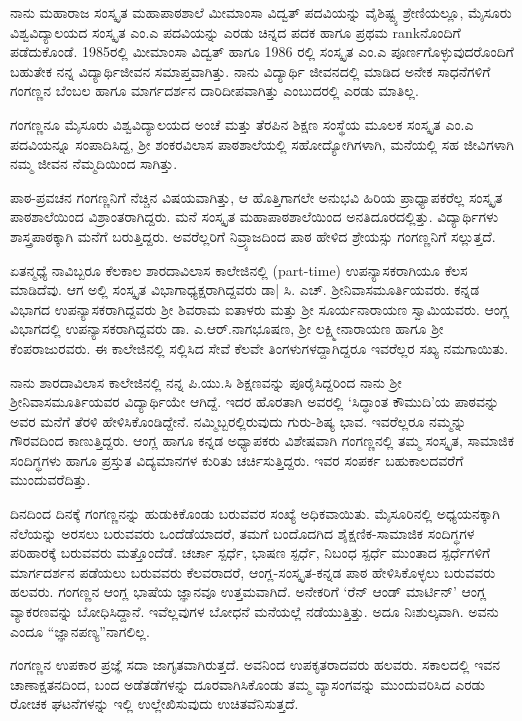 ನಾನು ಮಹಾರಾಜ ಸಂಸ್ಕೃತ ಮಹಾಪಾಠಶಾಲೆ ಮೀಮಾಂಸಾ ವಿದ್ವತ್ ಪದವಿಯನ್ನು ವೈಶಿಷ್ಟ್ಯ ಶ್ರೇಣಿಯಲ್ಲೂ, ಮೈಸೂರು  ವಿಶ್ವವಿದ್ಯಾಲಯದ ಸಂಸ್ಕೃತ  ಎಂ.ಎ ಪದವಿಯನ್ನು ಎರಡು ಚಿನ್ನದ ಪದಕ ಹಾಗೂ ಪ್ರಥಮ  rankನೊಂದಿಗೆ ಪಡೆದುಕೊಂಡೆ. 1985ರಲ್ಲಿ ಮೀಮಾಂಸಾ ವಿದ್ವತ್ ಹಾಗೂ 1986 ರಲ್ಲಿ ಸಂಸ್ಕೃತ ಎಂ.ಎ ಪೂರ್ಣಗೊಳ್ಳುವುದರೊಂದಿಗೆ ಬಹುತೇಕ ನನ್ನ ವಿದ್ಯಾರ್ಥಿಜೀವನ ಸಮಾಪ್ತವಾಗಿತ್ತು. ನಾನು ವಿದ್ಯಾರ್ಥಿ ಜೀವನದಲ್ಲಿ ಮಾಡಿದ ಅನೇಕ ಸಾಧನೆಗಳಿಗೆ ಗಂಗಣ್ಣನ ಬೆಂಬಲ ಹಾಗೂ ಮಾರ್ಗದರ್ಶನ ದಾರಿದೀಪವಾಗಿತ್ತು ಎಂಬುದರಲ್ಲಿ ಎರಡು ಮಾತಿಲ್ಲ.

ಗಂಗಣ್ಣನೂ ಮೈಸೂರು ವಿಶ್ವವಿದ್ಯಾಲಯದ ಅಂಚೆ ಮತ್ತು ತೆರಪಿನ ಶಿಕ್ಷಣ ಸಂಸ್ಥೆಯ ಮೂಲಕ ಸಂಸ್ಕೃತ ಎಂ.ಎ ಪದವಿಯನ್ನೂ ಸಂಪಾದಿಸಿದ್ದ, ಶ್ರೀ ಶಂಕರವಿಲಾಸ ಪಾಠಶಾಲೆಯಲ್ಲಿ ಸಹೋದ್ಯೋಗಿಗಳಾಗಿ, ಮನೆಯಲ್ಲಿ ಸಹ ಜೀವಿಗಳಾಗಿ ನಮ್ಮ ಜೀವನ ನೆಮ್ಮದಿಯಿಂದ ಸಾಗಿತ್ತು.

ಪಾಠ-ಪ್ರವಚನ ಗಂಗಣ್ಣನಿಗೆ ನೆಚ್ಚಿನ ವಿಷಯವಾಗಿತ್ತು, ಆ ಹೊತ್ತಿಗಾಗಲೇ ಅನುಭವಿ  ಹಿರಿಯ ಪ್ರಾಧ್ಯಾಪಕರೆಲ್ಲ ಸಂಸ್ಕೃತ  ಪಾಠಶಾಲೆಯಿಂದ ವಿಶ್ರಾಂತರಾಗಿದ್ದರು. ಮನೆ ಸಂಸ್ಕೃತ ಮಹಾಪಾಠಶಾಲೆಯಿಂದ ಅನತಿದೂರದಲ್ಲಿತ್ತು. ವಿದ್ಯಾರ್ಥಿಗಳು ಶಾಸ್ತ್ರಪಾಠಕ್ಕಾಗಿ ಮನೆಗೆ ಬರುತ್ತಿದ್ದರು. ಅವರೆಲ್ಲರಿಗೆ ನಿವ್ರ್ಯಾಜದಿಂದ ಪಾಠ ಹೇಳಿದ ಶ್ರೇಯಸ್ಸು ಗಂಗಣ್ಣನಿಗೆ ಸಲ್ಲುತ್ತದೆ.

ಏತನ್ಮಧ್ಯೆ ನಾವಿಬ್ಬರೂ ಕೆಲಕಾಲ ಶಾರದಾವಿಲಾಸ ಕಾಲೇಜಿನಲ್ಲಿ (part-time) ಉಪನ್ಯಾಸಕರಾಗಿಯೂ ಕೆಲಸ ಮಾಡಿದೆವು. ಆಗ ಅಲ್ಲಿ ಸಂಸ್ಕೃತ ವಿಭಾಗಾಧ್ಯಕ್ಷರಾಗಿದ್ದವರು ಡಾ| ಸಿ. ಎಚ್. ಶ್ರೀನಿವಾಸಮೂರ್ತಿಯವರು. ಕನ್ನಡ ವಿಭಾಗದ ಉಪನ್ಯಾಸಕರಾಗಿದ್ದವರು ಶ್ರೀ ಶಿವರಾಮ ಐತಾಳರು ಮತ್ತು ಶ್ರೀ ಸೂರ್ಯನಾರಾಯಣ ಸ್ವಾಮಿಯವರು. ಆಂಗ್ಲ ವಿಭಾಗದಲ್ಲಿ ಉಪನ್ಯಾಸಕರಾಗಿದ್ದವರು ಡಾ. ಎ.ಆರ್.ನಾಗಭೂಷಣ, ಶ್ರೀ ಲಕ್ಷ್ಮೀನಾರಾಯಣ ಹಾಗೂ ಶ್ರೀ ಕೆಂಪರಾಜುರವರು. ಈ ಕಾಲೇಜಿನಲ್ಲಿ ಸಲ್ಲಿಸಿದ ಸೇವೆ ಕೆಲವೇ ತಿಂಗಳುಗಳದ್ದಾಗಿದ್ದರೂ ಇವರೆಲ್ಲರ ಸಖ್ಯ ನಮಗಾಯಿತು. 

ನಾನು ಶಾರದಾವಿಲಾಸ ಕಾಲೇಜಿನಲ್ಲಿ ನನ್ನ ಪಿ.ಯು.ಸಿ ಶಿಕ್ಷಣವನ್ನು ಪೂರೈಸಿದ್ದರಿಂದ ನಾನು ಶ್ರೀ ಶ್ರೀನಿವಾಸಮೂರ್ತಿಯವರ ವಿದ್ಯಾರ್ಥಿಯೇ ಆಗಿದ್ದೆ. ಇದರ ಹೊರತಾಗಿ ಅವರಲ್ಲಿ ‘ಸಿದ್ಧಾಂತ ಕೌಮುದಿ’ಯ ಪಾಠವನ್ನು ಅವರ ಮನೆಗೆ ತೆರಳಿ ಹೇಳಿಸಿಕೊಂಡಿದ್ದೇನೆ. ನಮ್ಮಿಬ್ಬರಲ್ಲಿರುವುದು ಗುರು-ಶಿಷ್ಯ ಭಾವ. ಇವರೆಲ್ಲರೂ ನಮ್ಮನ್ನು ಗೌರವದಿಂದ ಕಾಣುತ್ತಿದ್ದರು. ಆಂಗ್ಲ ಹಾಗೂ ಕನ್ನಡ ಅಧ್ಯಾಪಕರು ವಿಶೇಷವಾಗಿ ಗಂಗಣ್ಣನಲ್ಲಿ ತಮ್ಮ ಸಂಸ್ಕೃತ, ಸಾಮಾಜಿಕ ಸಂದಿಗ್ಧಗಳು ಹಾಗೂ ಪ್ರಸ್ತುತ ವಿದ್ಯಮಾನಗಳ ಕುರಿತು ಚರ್ಚಿಸುತ್ತಿದ್ದರು. ಇವರ ಸಂಪರ್ಕ ಬಹುಕಾಲದವರೆಗೆ ಮುಂದುವರೆದಿತ್ತು.

ದಿನದಿಂದ ದಿನಕ್ಕೆ ಗಂಗಣ್ಣನನ್ನು ಹುಡುಕಿಕೊಂಡು ಬರುವವರ ಸಂಖ್ಯೆ ಅಧಿಕವಾಯಿತು. ಮೈಸೂರಿನಲ್ಲಿ ಅಧ್ಯಯನಕ್ಕಾಗಿ ನೆಲೆಯನ್ನು ಅರಸಲು ಬರುವವರು ಒಂದೆಡೆಯಾದರೆ, ತಮಗೆ ಬಂದೊದಗಿದ ಶೈಕ್ಷಣಿಕ-ಸಾಮಾಜಿಕ ಸಂದಿಗ್ಧಗಳ ಪರಿಹಾರಕ್ಕೆ ಬರುವವರು ಮತ್ತೊಂದೆಡೆ. ಚರ್ಚಾ ಸ್ಪರ್ಧೆ, ಭಾಷಣ ಸ್ಪರ್ಧೆ, ನಿಬಂಧ ಸ್ಪರ್ಧೆ ಮುಂತಾದ ಸ್ಪರ್ಧೆಗಳಿಗೆ ಮಾರ್ಗದರ್ಶನ ಪಡೆಯಲು ಬರುವವರು ಕೆಲವರಾದರೆ, ಆಂಗ್ಲ-ಸಂಸ್ಕೃತ-ಕನ್ನಡ ಪಾಠ ಹೇಳಿಸಿಕೊಳ್ಳಲು ಬರುವವರು ಹಲವರು. ಗಂಗಣ್ಣನ ಆಂಗ್ಲ ಭಾಷೆಯ ಜ್ಞಾನವೂ ಉತ್ತಮವಾಗಿದೆ. ಅನೇಕರಿಗೆ ‘ರೆನ್ ಆಂಡ್ ಮಾರ್ಟಿನ್’ ಆಂಗ್ಲ ವ್ಯಾಕರಣವನ್ನು ಬೋಧಿಸಿದ್ದಾನೆ. ಇವೆಲ್ಲವುಗಳ ಬೋಧನೆ ಮನೆಯಲ್ಲೆ ನಡೆಯುತ್ತಿತ್ತು. ಅದೂ ನಿಃಶುಲ್ಕವಾಗಿ. ಅವನು ಎಂದೂ “ಜ್ಞಾನಪಣ್ಯ”ನಾಗಲಿಲ್ಲ.

ಗಂಗಣ್ಣನ ಉಪಕಾರ ಪ್ರಜ್ಞೆ ಸದಾ ಜಾಗೃತವಾಗಿರುತ್ತದೆ. ಅವನಿಂದ ಉಪಕೃತರಾದವರು ಹಲವರು. ಸಕಾಲದಲ್ಲಿ ಇವನ ಚಾಣಾಕ್ಷತನದಿಂದ, ಬಂದ ಅಡೆತಡೆಗಳನ್ನು ದೂರವಾಗಿಸಿಕೊಂಡು ತಮ್ಮ ವ್ಯಾಸಂಗವನ್ನು ಮುಂದುವರಿಸಿದ ಎರಡು ರೋಚಕ ಘಟನೆಗಳನ್ನು ಇಲ್ಲಿ ಉಲ್ಲೇಖಿಸುವುದು ಉಚಿತವೆನಿಸುತ್ತದೆ.

